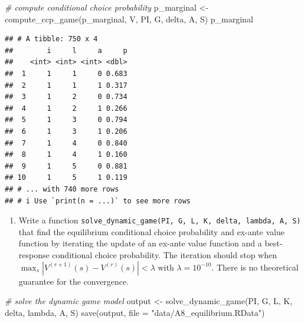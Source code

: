 \documentclass[
]{book}
\newenvironment{Shaded}{\begin{snugshade}}{\end{snugshade}}
\newcommand{\AttributeTok}[1]{\textcolor[rgb]{0.77,0.63,0.00}{#1}}
\newcommand{\CommentTok}[1]{\textcolor[rgb]{0.56,0.35,0.01}{\textit{#1}}}
\newcommand{\FunctionTok}[1]{\textcolor[rgb]{0.00,0.00,0.00}{#1}}
\newcommand{\NormalTok}[1]{#1}
\newcommand{\OtherTok}[1]{\textcolor[rgb]{0.56,0.35,0.01}{#1}}
\newcommand{\SpecialCharTok}[1]{\textcolor[rgb]{0.00,0.00,0.00}{#1}}
\newcommand{\StringTok}[1]{\textcolor[rgb]{0.31,0.60,0.02}{#1}}
\providecommand{\tightlist}{%
  \setlength{\itemsep}{0pt}\setlength{\parskip}{0pt}}
\begin{document}
\begin{Shaded}
\begin{Highlighting}[]
\CommentTok{\# compute conditional choice probability }
\NormalTok{p\_marginal }\OtherTok{\textless{}{-}} \FunctionTok{compute\_ccp\_game}\NormalTok{(p\_marginal, V, PI, G, delta, A, S)}
\NormalTok{p\_marginal}
\end{Highlighting}
\end{Shaded}

\begin{verbatim}
## # A tibble: 750 x 4
##        i     l     a     p
##    <int> <int> <int> <dbl>
##  1     1     1     0 0.683
##  2     1     1     1 0.317
##  3     1     2     0 0.734
##  4     1     2     1 0.266
##  5     1     3     0 0.794
##  6     1     3     1 0.206
##  7     1     4     0 0.840
##  8     1     4     1 0.160
##  9     1     5     0 0.881
## 10     1     5     1 0.119
## # ... with 740 more rows
## # i Use `print(n = ...)` to see more rows
\end{verbatim}

\begin{enumerate}
\def\labelenumi{\arabic{enumi}.}
\setcounter{enumi}{10}
\tightlist
\item
  Write a function \texttt{solve\_dynamic\_game(PI,\ G,\ L,\ K,\ delta,\ lambda,\ A,\ S)} that find the equilibrium conditional choice probability and ex-ante value function by iterating the update of an ex-ante value function and a best-response conditional choice probability. The iteration should stop when \(\max_s|V^{(r + 1)}(s) - V^{(r)}(s)| < \lambda\) with \(\lambda = 10^{-10}\). There is no theoretical guarantee for the convergence.
\end{enumerate}

\begin{Shaded}
\begin{Highlighting}[]
\CommentTok{\# solve the dynamic game model}
\NormalTok{output }\OtherTok{\textless{}{-}}
  \FunctionTok{solve\_dynamic\_game}\NormalTok{(PI, G, L, K, delta, lambda, A, S)}
\FunctionTok{save}\NormalTok{(output, }\AttributeTok{file =} \StringTok{"data/A8\_equilibrium.RData"}\NormalTok{)}
\end{Highlighting}
\end{Shaded}

\begin{Shaded}
\end{Shaded}
\end{document}
